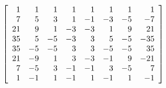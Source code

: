 $$
\left[
\begin{array}{*{8}r}
1  & 1  & 1  & 1  & 1  & 1  & 1  & 1\\
7  & 5  & 3  & 1  & -1  & -3  & -5  & -7\\
21  & 9  & 1  & -3  & -3  & 1  & 9  & 21\\
35  & 5  & -5  & -3  & 3  & 5  & -5  & -35\\
35  & -5  & -5  & 3  & 3  & -5  & -5  & 35\\
21  & -9  & 1  & 3  & -3  & -1  & 9  & -21\\
7  & -5  & 3  & -1  & -1  & 3  & -5  & 7\\
1  & -1  & 1  & -1  & 1  & -1  & 1  & -1\\
\end{array}
\right]
$$
